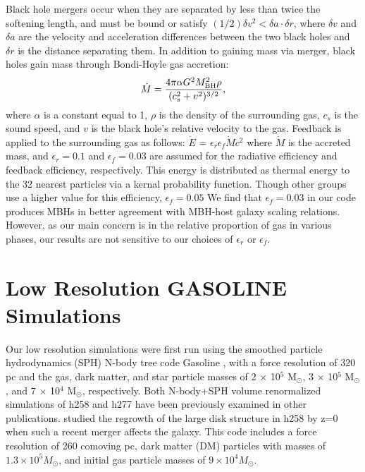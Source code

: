 \documentclass[12pt,headA,chapB]{fiskthesis}
\begin{document}
Black hole mergers occur when they are separated by less than twice the softening length, and must be bound or satisfy $(1/2) \delta v^2 < \delta a \cdot \delta r$,  where $\delta v$ and $\delta a$ are the velocity and acceleration differences between the two black holes and $\delta r$ is the distance separating them. In addition to gaining mass via merger, black holes gain mass through Bondi-Hoyle gas accretion:
\begin{equation}
\dot{M} = \frac{4 \pi \alpha G^2 M^{2}_{\rm BH} \rho}{(c^{2}_{s} + v^2)^{3/2}},
\end{equation}
where $\alpha$ is a constant equal to 1, $\rho$ is the density of the surrounding gas, $c_s$ is the sound speed, and $v$ is the black hole's relative velocity to the gas. Feedback is applied to the surrounding gas as follows: $\dot{E}$ = $\epsilon _{r}$$\epsilon_{f}$$\dot{M}$$c^2$ where $\dot{M}$ is the accreted mass, and $\epsilon _r = 0.1$ and $\epsilon _f = 0.03$ are assumed for the radiative efficiency and feedback efficiency, respectively. This energy is distributed as thermal energy to the 32 nearest particles via a kernal probability function. Though other groups use a higher value for this efficiency, $\epsilon _f = 0.05$ \citep{Sijacki2007,DiMatteo2008} We find that $\epsilon_f = 0.03$ in our code produces MBHs in better agreement with MBH-host galaxy scaling relations. However, as our main concern is in the relative proportion of gas in various phases, our results are not sensitive to our choices of $\epsilon _{r}$ or $\epsilon_{f}$.
 
\section{\normalsize Low Resolution GASOLINE Simulations}

Our low resolution simulations were first run using the smoothed particle hydrodynamics (SPH) N-body tree code Gasoline \citep{Wadsley2004}, with a force resolution of 320 pc and the gas, dark matter, and star particle masses of 2 $\times$ 10$^5$ M$_{\odot}$, 3 $\times$ 10$^5$ M$_{\odot}$, and 7 $\times$ 10$^4$ M$_{\odot}$, respectively. Both N-body+SPH volume renormalized simulations of h258 and h277 have been previously examined in other publications. \cite{Governato2009} studied the regrowth of the large disk structure in h258 by z=0 when such a recent merger affects the galaxy. This code includes a force resolution of 260 comoving pc, dark matter (DM) particles with masses of $1.3 \times 10^5 M_{\odot}$, and initial gas particle masses of $9 \times 10^4 M_{\odot}$.  
	
\end{document}
